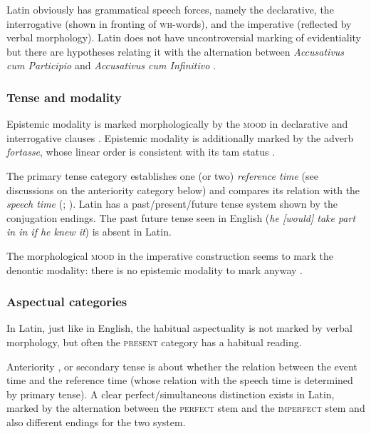 \documentclass[a4paper, oneside, 12pt]{report}
\newcommand*{\citepage}[1]{p.~{#1}}
\newcommand*{\citepages}[1]{pp.~{#1}}
\newcommand{\form}[1]{\emph{#1}}
\newcommand*{\category}[1]{\textsc{#1}}
\begin{document}
Latin obviously has grammatical speech forces,
namely the declarative, the interrogative (shown in fronting of \category{wh}-words), and the imperative (reflected by verbal morphology).
Latin does not have uncontroversial marking of evidentiality
but there are hypotheses relating it with the alternation between
\form{Accusativus cum Participio} and \form{Accusativus cum Infinitivo} \citep{greco2013latin}.

\subsubsection{Tense and modality}

Epistemic modality is marked morphologically by the \category{mood} in declarative and interrogative clauses 
\citep[\citepage{388}]{Pinkster1}.
Epistemic modality is additionally marked by the adverb \form{fortasse},
whose linear order is consistent with its \ac{tam} status \citep[\citepage{27}]{danckaert2017development}.

The primary tense category establishes one (or two) \emph{reference time} (see discussions on the anteriority category below)
and compares its relation with the \emph{speech time} 
(\citealt[\citepages{81-83}]{cinque1999adverbs}; \citealt[\citepages{126-127}]{cgel}).
Latin has a past/present/future tense system shown by the conjugation endings.
The past future tense seen in English (\form{he [would] take part in in if he knew it})
is absent in Latin.

The morphological \category{mood} in the imperative construction
seems to mark the denontic modality:
there is no epistemic modality to mark anyway
\citep[\citepage{388}]{Pinkster1}.

\subsubsection{Aspectual categories}

In Latin, just like in English,
the habitual aspectuality is not marked by verbal morphology,
but often the \category{present} category has a habitual reading.

Anteriority \citep[\citepages{81-83}]{cinque1999adverbs},
or secondary tense \citep[\citepages{139-140}]{cgel} is about whether the relation between the event time and the reference time 
(whose relation with the speech time is determined by primary tense).
A clear perfect/simultaneous distinction exists in Latin, marked by the alternation between 
the \category{perfect} stem and the \category{imperfect} stem and also different endings for the two system.
\end{document}

